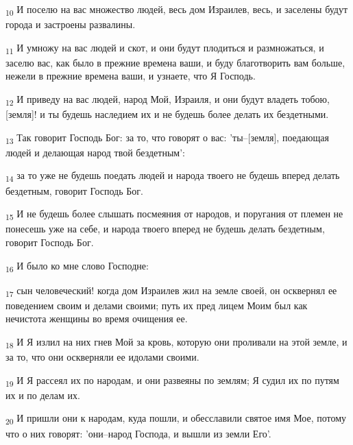 \begin{tcolorbox}
\textsubscript{10} И поселю на вас множество людей, весь дом Израилев, весь, и заселены будут города и застроены развалины.
\end{tcolorbox}
\begin{tcolorbox}
\textsubscript{11} И умножу на вас людей и скот, и они будут плодиться и размножаться, и заселю вас, как было в прежние времена ваши, и буду благотворить вам больше, нежели в прежние времена ваши, и узнаете, что Я Господь.
\end{tcolorbox}
\begin{tcolorbox}
\textsubscript{12} И приведу на вас людей, народ Мой, Израиля, и они будут владеть тобою, [земля]! и ты будешь наследием их и не будешь более делать их бездетными.
\end{tcolorbox}
\begin{tcolorbox}
\textsubscript{13} Так говорит Господь Бог: за то, что говорят о вас: 'ты--[земля], поедающая людей и делающая народ твой бездетным':
\end{tcolorbox}
\begin{tcolorbox}
\textsubscript{14} за то уже не будешь поедать людей и народа твоего не будешь вперед делать бездетным, говорит Господь Бог.
\end{tcolorbox}
\begin{tcolorbox}
\textsubscript{15} И не будешь более слышать посмеяния от народов, и поругания от племен не понесешь уже на себе, и народа твоего вперед не будешь делать бездетным, говорит Господь Бог.
\end{tcolorbox}
\begin{tcolorbox}
\textsubscript{16} И было ко мне слово Господне:
\end{tcolorbox}
\begin{tcolorbox}
\textsubscript{17} сын человеческий! когда дом Израилев жил на земле своей, он осквернял ее поведением своим и делами своими; путь их пред лицем Моим был как нечистота женщины во время очищения ее.
\end{tcolorbox}
\begin{tcolorbox}
\textsubscript{18} И Я излил на них гнев Мой за кровь, которую они проливали на этой земле, и за то, что они оскверняли ее идолами своими.
\end{tcolorbox}
\begin{tcolorbox}
\textsubscript{19} И Я рассеял их по народам, и они развеяны по землям; Я судил их по путям их и по делам их.
\end{tcolorbox}
\begin{tcolorbox}
\textsubscript{20} И пришли они к народам, куда пошли, и обесславили святое имя Мое, потому что о них говорят: 'они--народ Господа, и вышли из земли Его'.
\end{tcolorbox}
